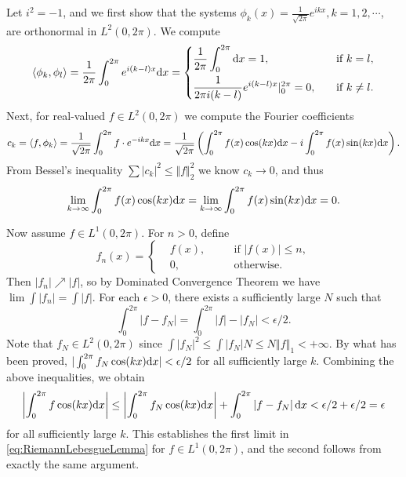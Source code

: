 \begin{exercise}{8.15}
  Let $i^2 = -1$, and we first show that the systems
  $\phi_k(x) = \frac{1}{\sqrt{2\pi}} e^{i k x}, k = 1, 2, \cdots$,
  are orthonormal in $L^2(0, 2\pi)$.
  We compute
  \[
    \left< \phi_k, \phi_l \right>
    = \frac{1}{2\pi} \int_0^{2\pi} e^{i (k-l) x} \mathrm{d} x
    = \left\{
    \begin{aligned}
      & \frac{1}{2\pi} \int_0^{2\pi} \mathrm{d} x = 1, \quad &&\text{if }k=l, \\
      & \frac{1}{2 \pi i (k-l)} e^{i (k-l) x}\vert_{0}^{2\pi} = 0,
      \quad &&\text{if }k\neq l.
    \end{aligned}
    \right.
  \]
  Next, for real-valued $f \in L^2(0, 2\pi)$
  we compute the Fourier coefficients
  \[
    c_k = \left< f, \phi_k \right>
    = \frac{1}{\sqrt{2\pi}} \int_0^{2\pi} f \cdot e^{-i k x} \mathrm{d} x
    = \frac{1}{\sqrt{2\pi}} \left(
    \int_0^{2\pi} f(x) \cos(kx) \mathrm{d} x
    - i \int_0^{2\pi} f(x) \sin(kx) \mathrm{d} x
    \right).
  \]
  From Bessel's inequality $\sum |c_k|^2 \le \Vert f \Vert_2^2$
  we know $c_k \rightarrow 0$, and thus
  \begin{equation}
    \lim_{k \rightarrow \infty} \int_0^{2\pi} f(x) \cos(kx) \mathrm{d} x
    = \lim_{k \rightarrow \infty} \int_0^{2\pi} f(x) \sin(kx) \mathrm{d} x
    = 0.
    \label{eq:RiemannLebesgueLemma}
  \end{equation}

  Now assume $f \in L^1(0, 2\pi)$.
  For $n > 0$, define
  \[
    f_n(x) = \left\{
    \begin{aligned}
      & f(x), \quad &&\text{if }\left\vert f(x) \right\vert \le n, \\
      & 0, \quad &&\text{otherwise}.
    \end{aligned}
    \right.
  \]
  Then $|f_n| \nearrow |f|$,
  so by Dominated Convergence Theorem we have $\lim \int |f_n| = \int |f|$.
  For each $\epsilon > 0$,
  there exists a sufficiently large $N$ such that
  \[
    \int_0^{2\pi} \left| f - f_N \right|
    = \int_0^{2\pi} \left| f \right| - \left| f_N \right|
    < \epsilon/2.
  \]
  Note that $f_N \in L^2(0, 2\pi)$ since
  $\int \left| f_N \right|^2 \le \int \left| f_N \right| N
  \le N \left\Vert f \right\Vert_1 < +\infty$.
  By what has been proved,
  $| \int_0^{2\pi} f_N \cos(kx) \mathrm{d} x | < \epsilon/2$
  for all sufficiently large $k$.
  Combining the above inequalities, we obtain
  \[
    \left| \int_0^{2\pi} f \cos(kx) \mathrm{d} x \right|
    \le \left| \int_0^{2\pi} f_N \cos(kx) \mathrm{d} x \right|
    + \int_0^{2\pi} \left|f - f_N\right| \mathrm{d} x
    < \epsilon/2 + \epsilon/2 = \epsilon
  \]
  for all sufficiently large $k$.
  This establishes the first limit in \eqref{eq:RiemannLebesgueLemma}
  for $f \in L^1(0, 2\pi)$,
  and the second follows from exactly the same argument.
\end{exercise}

